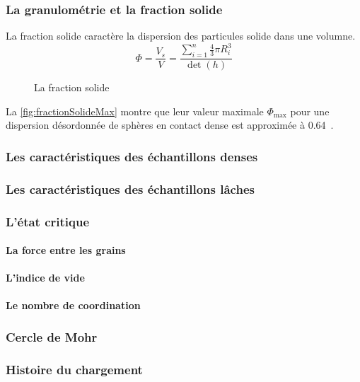 \documentclass[a4paper,12pt]{report}
\begin{document}
\subsubsection{La granulométrie et la fraction solide}
La fraction solide caractère la dispersion des particules solide dans une volumne.
\[
\Phi = \dfrac{V_s}{V} = \dfrac{\sum\limits_{i = 1}^n \frac{4}{3}\pi R_i^3}{\det(h)}
\]
                                \begin{figure}
                                   \centering \small 
                                    \caption{La fraction solide}
                                    \label{fig:fractionSolideMax}
                                \end{figure}

La \autoref{fig:fractionSolideMax} montre que leur valeur maximale $\Phi_{\max}$ pour une dispersion désordonnée de sphères en contact dense est approximée à 0.64~\cite{combe2023demlecture}.
\subsubsection{Les caractéristiques des échantillons denses}
\subsubsection{Les caractéristiques des échantillons lâches}
\subsubsection{L'état critique}
\paragraph{La force entre les grains}
\paragraph{L'indice de vide}
\paragraph{Le nombre de coordination}
\subsubsection{Cercle de Mohr}
\subsubsection{Histoire du chargement}
\end{document}
